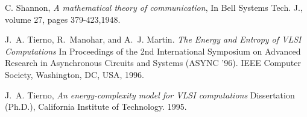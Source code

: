 \documentclass[10pt,journal,compsoc]{IEEEtran}
\begin{document}
\begin{thebibliography}{1}
	C. Shannon, \emph{ A mathematical theory of communication},
	In Bell Systems Tech. J., volume 27, pages 379-423,1948.

	J.~A. Tierno, R.~Manohar, and A.~J. Martin. \emph{The Energy and
	Entropy of VLSI Computations} In Proceedings of the 2nd International
	Symposium on Advanced Research in Asynchronous Circuits and Systems (ASYNC
	'96). IEEE Computer Society, Washington, DC, USA, 1996.

	J.~A. Tierno, \emph{An energy-complexity model for VLSI
	computations} Dissertation (Ph.D.), California Institute of Technology.
	1995.

\end{thebibliography}






\end{document}
